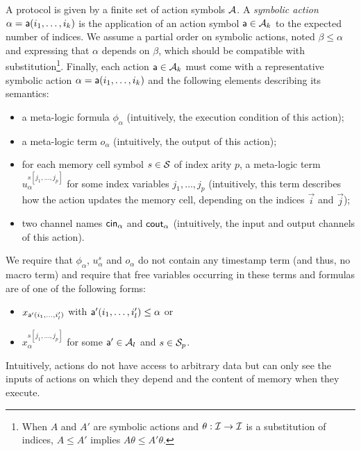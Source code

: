 \begin{definition} \label{def:action} \label{def:proto}
  A protocol is given by a finite set of action symbols $\mathcal{A}$.
  A \emph{symbolic action} $\alpha = \textsf{a}(i_1,\ldots,i_k)$
  is the application of an action symbol $\textsf{a} \in \mathcal{A}_k$
  to the expected  number of indices.
  We assume a partial order on symbolic actions,
  noted $\beta \leq \alpha$ and expressing that $\alpha$ depends on $\beta$,
  which should be compatible with substitution\footnote{
    When $A$ and $A'$ are symbolic actions and $\theta : \mathcal{I} \to \mathcal{I}$
    is a substitution of indices,
    $A \leq A'$ implies $A\theta \leq A'\theta$.
  }.
  Finally, each action $\textsf{a} \in \mathcal{A}_k$ must come with
  a representative symbolic action $\alpha = \textsf{a}(i_1,\ldots,i_k)$ and
  the following elements describing its semantics:
  \begin{itemize}
    \item a meta-logic formula $\phi_{\alpha}$
      (intuitively, the execution condition of this action);
    \item a meta-logic term $o_{\alpha}$
      (intuitively, the output of this action);
    \item for each memory cell symbol $s \in \mathcal{S}$ of index arity $p$,
      a meta-logic term $u_{\alpha}^{s[j_1,\ldots,j_p]}$
      for some index variables $j_1,\ldots,j_p$
      (intuitively, this term describes how the action updates the memory
      cell, depending on the indices $\vec{i}$ and $\vec{j}$);
    \item two channel names $\mathsf{cin}_\alpha$ and $\mathsf{cout}_\alpha$
      (intuitively, the input and output channels of this action).
  \end{itemize}
  We require that
  $\phi_{\alpha}$, $u_{\alpha}^{s}$ and $o_{\alpha}$ do not contain any
  timestamp term (and thus, no macro term) and require that
  free variables occurring in these terms and formulas are
  of one of the following forms:
  \begin{itemize}
    \item $x_{\textsf{a}'(i_1,\ldots,i'_l)}$
      with $\textsf{a}'(i_1,\ldots,i'_l)\leq \alpha$ or
    \item $x^{s[j_1,\ldots,j_p]}_\alpha$
      for some $\textsf{a}' \in \mathcal{A}_l$ and $s \in \mathcal{S}_p$.
  \end{itemize}
  Intuitively, actions do not have access to arbitrary data but can only
  see the inputs of actions on which they depend
  and the content of memory when they execute.
\end{definition}

